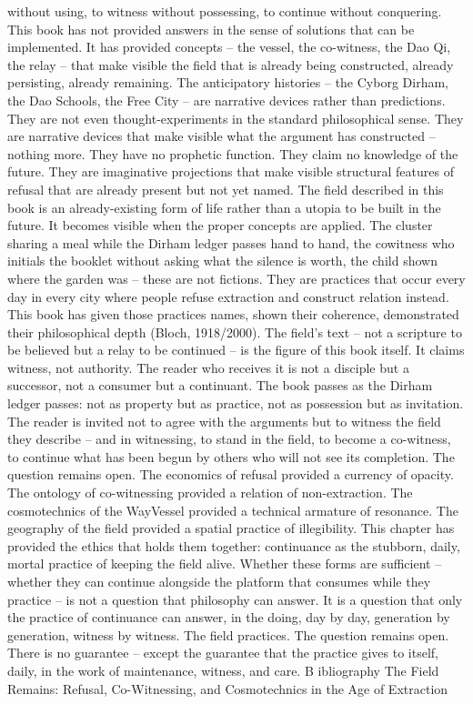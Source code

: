 without using, to witness without possessing, to continue without conquering. This book has not provided answers in the sense of solutions that can be implemented. It has provided concepts – the vessel, the co-witness, the Dao Qi, the relay – that make visible the field that is already being constructed, already persisting, already remaining. The anticipatory histories – the Cyborg Dirham, the Dao Schools, the Free City – are narrative devices rather than predictions. They are not even thought-experiments in the standard philosophical sense. They are narrative devices that make visible what the argument has constructed – nothing more. They have no prophetic function. They claim no knowledge of the future. They are imaginative projections that make visible structural features of refusal that are already present but not yet named. The field described in this book is an already-existing form of life rather than a utopia to be built in the future. It becomes visible when the proper concepts are applied. The cluster sharing a meal while the Dirham ledger passes hand to hand, the cowitness who initials the booklet without asking what the silence is worth, the child shown where the garden was – these are not fictions. They are practices that occur every day in every city where people refuse extraction and construct relation instead. This book has given those practices names, shown their coherence, demonstrated their philosophical depth (Bloch, 1918/2000). The field’s text – not a scripture to be believed but a relay to be continued – is the figure of this book itself. It claims witness, not authority. The reader who receives it is not a disciple but a successor, not a consumer but a continuant. The book passes as the Dirham ledger passes: not as property but as practice, not as possession but as invitation. The reader is invited not to agree with the arguments but to witness the field they describe – and in witnessing, to stand in the field, to become a co-witness, to continue what has been begun by others who will not see its completion. The question remains open. The economics of refusal provided a currency of opacity. The ontology of co-witnessing provided a relation of non-extraction. The cosmotechnics of the WayVessel provided a technical armature of resonance. The geography of the field provided a spatial practice of illegibility. This chapter has provided the ethics that holds them together: continuance as the stubborn, daily, mortal practice of keeping the field alive. Whether these forms are sufficient – whether they can continue alongside the platform that consumes while they practice – is not a question that philosophy can answer. It is a question that only the practice of continuance can answer, in the doing, day by day, generation by generation, witness by witness. The field practices. The question remains open. There is no guarantee – except the guarantee that the practice gives to itself, daily, in the work of maintenance, witness, and care. B ibliography The Field Remains: Refusal, Co-Witnessing, and Cosmotechnics in the Age of Extraction
